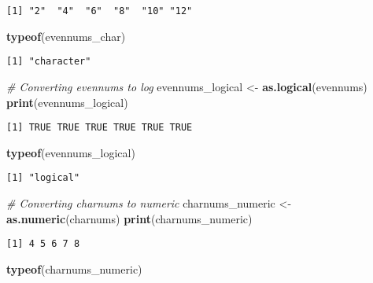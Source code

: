 \documentclass[
]{article}
\newenvironment{Shaded}{\begin{snugshade}}{\end{snugshade}}
\newcommand{\CommentTok}[1]{\textcolor[rgb]{0.56,0.35,0.01}{\textit{#1}}}
\newcommand{\FunctionTok}[1]{\textcolor[rgb]{0.13,0.29,0.53}{\textbf{#1}}}
\newcommand{\NormalTok}[1]{#1}
\newcommand{\OtherTok}[1]{\textcolor[rgb]{0.56,0.35,0.01}{#1}}
\begin{document}
\begin{verbatim}
[1] "2"  "4"  "6"  "8"  "10" "12"
\end{verbatim}

\begin{Shaded}
\begin{Highlighting}[]
\FunctionTok{typeof}\NormalTok{(evennums\_char)}
\end{Highlighting}
\end{Shaded}

\begin{verbatim}
[1] "character"
\end{verbatim}

\begin{Shaded}
\begin{Highlighting}[]
\CommentTok{\# Converting evennums to log}
\NormalTok{evennums\_logical }\OtherTok{\textless{}{-}} \FunctionTok{as.logical}\NormalTok{(evennums)}
\FunctionTok{print}\NormalTok{(evennums\_logical)}
\end{Highlighting}
\end{Shaded}

\begin{verbatim}
[1] TRUE TRUE TRUE TRUE TRUE TRUE
\end{verbatim}

\begin{Shaded}
\begin{Highlighting}[]
\FunctionTok{typeof}\NormalTok{(evennums\_logical)}
\end{Highlighting}
\end{Shaded}

\begin{verbatim}
[1] "logical"
\end{verbatim}

\begin{Shaded}
\begin{Highlighting}[]
\CommentTok{\# Converting charnums to numeric}
\NormalTok{charnums\_numeric }\OtherTok{\textless{}{-}} \FunctionTok{as.numeric}\NormalTok{(charnums)}
\FunctionTok{print}\NormalTok{(charnums\_numeric)}
\end{Highlighting}
\end{Shaded}

\begin{verbatim}
[1] 4 5 6 7 8
\end{verbatim}

\begin{Shaded}
\begin{Highlighting}[]
\FunctionTok{typeof}\NormalTok{(charnums\_numeric)}
\end{Highlighting}
\end{Shaded}
\end{document}

